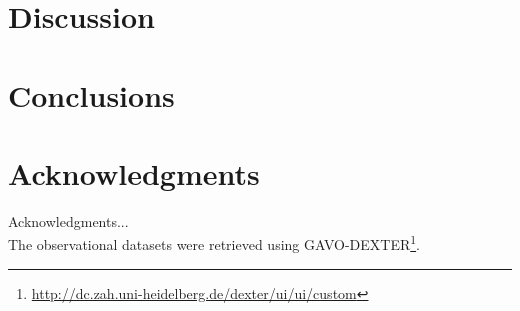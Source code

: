 \documentclass{emulateapj}
\begin{document}
\section{Discussion}
\label{sec:discussion}


\section{Conclusions}
\label{sec:conclusions}


\section*{Acknowledgments}
Acknowledgments...\\

The observational datasets were retrieved using
GAVO-DEXTER\footnote{\url{http://dc.zah.uni-heidelberg.de/dexter/ui/ui/custom}}. 



\end{document}
